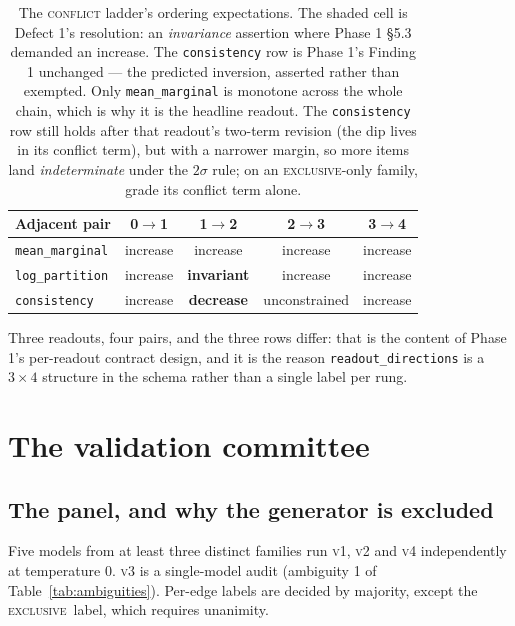 \documentclass[11pt]{article}
\newcommand{\cExc}{\textsc{exclusive}}
\newcommand{\readout}[1]{\texttt{#1}}
\begin{document}
\begin{table}[h]\centering\small
\renewcommand{\arraystretch}{1.15}
\begin{tabular}{@{}lcccc@{}}
\toprule
\textbf{Adjacent pair} & \textbf{0$\to$1} & \textbf{1$\to$2} & \textbf{2$\to$3} &
\textbf{3$\to$4}\\
\midrule
\readout{mean\_marginal} & increase & increase & increase & increase\\
\rowcolor{cFix}
\readout{log\_partition} & increase & \textbf{invariant} & increase & increase\\
\readout{consistency}    & increase & \textbf{decrease} & unconstrained & increase\\
\bottomrule
\end{tabular}
\caption{The \textsc{conflict} ladder's ordering expectations. The shaded cell is Defect 1's
resolution: an \emph{invariance} assertion where Phase 1 §5.3 demanded an increase. The
\readout{consistency} row is Phase 1's Finding 1 unchanged --- the predicted inversion, asserted
rather than exempted. Only \readout{mean\_marginal} is monotone across the whole chain, which is
why it is the headline readout. The \readout{consistency} row still holds after that readout's
two-term revision (the dip lives in its conflict term), but with a narrower margin, so more
items land \emph{indeterminate} under the $2\sigma$ rule; on an \cExc-only family, grade its
conflict term alone.}
\label{tab:expectations}
\end{table}

\noindent Three readouts, four pairs, and the three rows differ: that is the content of Phase 1's
per-readout contract design, and it is the reason \texttt{readout\_directions} is a
$3 \times 4$ structure in the schema rather than a single label per rung.

\section{The validation committee}
\label{sec:committee}

\subsection{The panel, and why the generator is excluded}

Five models from at least three distinct families run \textsc{v1}, \textsc{v2} and \textsc{v4}
independently at temperature 0. \textsc{v3} is a single-model audit (ambiguity 1 of
Table~\ref{tab:ambiguities}). Per-edge labels are decided by majority, except the \cExc\ label,
which requires unanimity.
\end{document}
